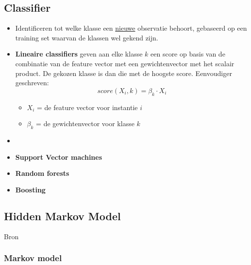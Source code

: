 \subsection{Classifier}
\begin{itemize}
	\item Identificeren tot welke klasse een \underline{nieuwe} observatie behoort, gebaseerd op een training set waarvan de klassen wel gekend zijn.
	\item \textbf{Lineaire classifiers} geven aan elke klasse $k$ een score op basis van de combinatie van de feature vector met een gewichtenvector met het scalair product.  De gekozen klasse is dan die met de hoogste score. Eenvoudiger geschreven:	
	$$
	score(X_i, k) = \beta_k \cdot X_i
	$$
	\begin{itemize}
		\item $X_i$ = de feature vector voor instantie $i$
		\item $\beta_k$ = de gewichtenvector voor klasse $k$
	\end{itemize}
	\item {}
	\item \textbf{Support Vector machines}
	\item \textbf{Random forests}
	\item \textbf{Boosting}
\end{itemize}




\subsection{Hidden Markov Model}
\label{sec:hidden_markov_model}
Bron \cite{Ramage2007}
\subsubsection{Markov model}

